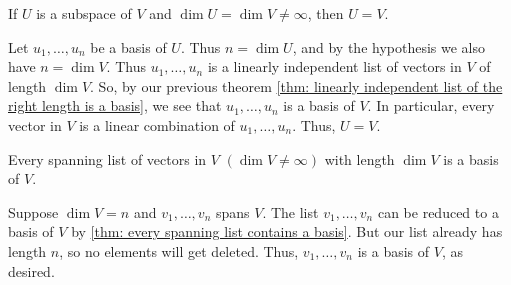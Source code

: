 \begin{thm} 
  \label{thm: subspace of full dimension equals the whole space}
  If $U$ is a subspace of $V$ and $\dim U = \dim V \neq \infty$, then $U=V$.
\end{thm}
\begin{prf}
  Let $u_1, \ldots, u_n$ be a basis of $U$. Thus $n = \dim U$, and by the hypothesis we also have $n = \dim V$. Thus $u_1, \ldots, u_n$ is a linearly independent list of vectors in $V$ of length $\dim V$. So, by our previous theorem \ref{thm: linearly independent list of the right length is a basis}, we see that $u_1, \ldots, u_n$ is a basis of $V$. In particular, every vector in $V$ is a linear combination of $u_1, \ldots, u_n$. Thus, $U=V$.
\end{prf}

\setcounter{thm}{41}
\begin{thm} 
  \label{thm: spanning list of the right length}
  Every spanning list of vectors in $V$ $(\dim V \neq \infty)$ with length $\dim V$ is a basis of $V$.
\end{thm}
\begin{prf}
  Suppose $\dim V = n$ and $v_1, \ldots, v_n$ spans $V$. The list $v_1, \ldots, v_n$ can be reduced to a basis of $V$ by \ref{thm: every spanning list contains a basis}. But our list already has length $n$, so no elements will get deleted. Thus, $v_1, \ldots, v_n$ is a basis of $V$, as desired.
\end{prf}

